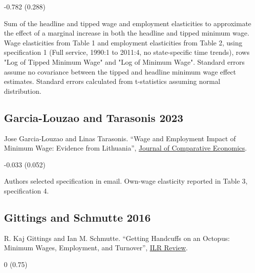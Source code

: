 \vspace{0.7em}

 -0.782 (0.288)

\vspace{0.7em}

 Sum of the headline and tipped wage and employment elasticities to approximate the effect of a marginal increase in both the headline and tipped minimum wage. Wage elasticities from Table 1 and employment elasticities from Table 2, using specification 1 (Full service, 1990:1 to 2011:4, no state-specific time trends), rows "Log of Tipped Minimum Wage" and "Log of Minimum Wage". Standard errors assume no covariance between the tipped and headline minimum wage effect estimates. Standard errors calculated from t-statistics assuming normal distribution.

\subsection*{Garcia-Louzao and Tarasonis 2023}
\vspace{-0.7em}

\noindent Jose Garcia-Louzao and Linas Tarasonis. ``Wage and Employment Impact of Minimum Wage: Evidence from Lithuania'', \href{https://doi.org/10.1016/j.jce.2022.12.002}{Journal of Comparative Economics}.

\vspace{0.7em}

 -0.033 (0.052)

\vspace{0.7em}

 Authors selected specification in email. Own-wage elasticity reported in Table 3, specification 4.

\subsection*{Gittings and Schmutte 2016}
\vspace{-0.7em}

\noindent R. Kaj Gittings and Ian M. Schmutte. ``Getting Handcuffs on an Octopus: Minimum Wages, Employment, and Turnover'', \href{https://doi.org/10.1177/0019793915623519}{ILR Review}.

\vspace{0.7em}

 0 (0.75)

